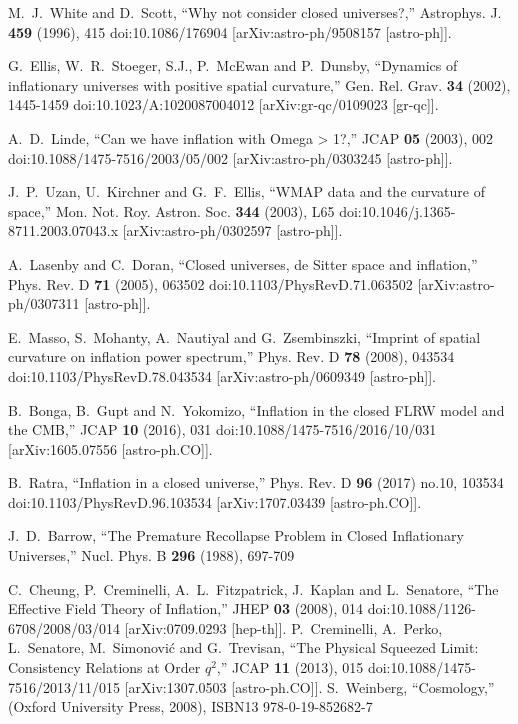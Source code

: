 \documentclass[a4paper,11pt]{article}
\numberwithin{equation}{section}
\begin{document}
\begin{thebibliography}{99}
M.~J.~White and D.~Scott,
``Why not consider closed universes?,''
Astrophys. J. \textbf{459} (1996), 415
doi:10.1086/176904
[arXiv:astro-ph/9508157 [astro-ph]].

G.~Ellis, W.~R.~Stoeger, S.J., P.~McEwan and P.~Dunsby,
``Dynamics of inflationary universes with positive spatial curvature,''
Gen. Rel. Grav. \textbf{34} (2002), 1445-1459
doi:10.1023/A:1020087004012
[arXiv:gr-qc/0109023 [gr-qc]].

A.~D.~Linde,
``Can we have inflation with Omega > 1?,''
JCAP \textbf{05} (2003), 002
doi:10.1088/1475-7516/2003/05/002
[arXiv:astro-ph/0303245 [astro-ph]].

J.~P.~Uzan, U.~Kirchner and G.~F.~Ellis,
``WMAP data and the curvature of space,''
Mon. Not. Roy. Astron. Soc. \textbf{344} (2003), L65
doi:10.1046/j.1365-8711.2003.07043.x
[arXiv:astro-ph/0302597 [astro-ph]].

A.~Lasenby and C.~Doran,
``Closed universes, de Sitter space and inflation,''
Phys. Rev. D \textbf{71} (2005), 063502
doi:10.1103/PhysRevD.71.063502
[arXiv:astro-ph/0307311 [astro-ph]].

E.~Masso, S.~Mohanty, A.~Nautiyal and G.~Zsembinszki,
``Imprint of spatial curvature on inflation power spectrum,''
Phys. Rev. D \textbf{78} (2008), 043534
doi:10.1103/PhysRevD.78.043534
[arXiv:astro-ph/0609349 [astro-ph]].

B.~Bonga, B.~Gupt and N.~Yokomizo,
``Inflation in the closed FLRW model and the CMB,''
JCAP \textbf{10} (2016), 031
doi:10.1088/1475-7516/2016/10/031
[arXiv:1605.07556 [astro-ph.CO]].

B.~Ratra,
``Inflation in a closed universe,''
Phys. Rev. D \textbf{96} (2017) no.10, 103534
doi:10.1103/PhysRevD.96.103534
[arXiv:1707.03439 [astro-ph.CO]].


J.~D.~Barrow,
``The Premature Recollapse Problem in Closed Inflationary Universes,''
Nucl. Phys. B \textbf{296} (1988), 697-709

C.~Cheung, P.~Creminelli, A.~L.~Fitzpatrick, J.~Kaplan and L.~Senatore,
``The Effective Field Theory of Inflation,''
JHEP \textbf{03} (2008), 014
doi:10.1088/1126-6708/2008/03/014
[arXiv:0709.0293 [hep-th]].
P.~Creminelli, A.~Perko, L.~Senatore, M.~Simonović and G.~Trevisan,
``The Physical Squeezed Limit: Consistency Relations at Order $q^2$,''
JCAP \textbf{11} (2013), 015
doi:10.1088/1475-7516/2013/11/015
[arXiv:1307.0503 [astro-ph.CO]].
 S.~Weinberg,
``Cosmology,'' (Oxford University Press, 2008), ISBN13 978-0-19-852682-7



\end{thebibliography}
\end{document}
